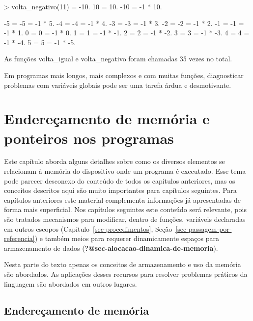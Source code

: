 \documentclass[
  11pt,
  a4paper,
]{scrbook}
\newenvironment{Shaded}{\begin{snugshade}}{\end{snugshade}}
\newcommand{\NormalTok}[1]{#1}
\begin{document}
\begin{Shaded}
\begin{Highlighting}[]
\NormalTok{\textgreater{} volta\_negativo(11) = {-}10.}
\NormalTok{10 = 10.}
\NormalTok{{-}10 = {-}1 * 10.}

\NormalTok{{-}5 = {-}5 = {-}1 * 5.}
\NormalTok{{-}4 = {-}4 = {-}1 * 4.}
\NormalTok{{-}3 = {-}3 = {-}1 * 3.}
\NormalTok{{-}2 = {-}2 = {-}1 * 2.}
\NormalTok{{-}1 = {-}1 = {-}1 * 1.}
\NormalTok{0 = 0 = {-}1 * 0.}
\NormalTok{1 = 1 = {-}1 * {-}1.}
\NormalTok{2 = 2 = {-}1 * {-}2.}
\NormalTok{3 = 3 = {-}1 * {-}3.}
\NormalTok{4 = 4 = {-}1 * {-}4.}
\NormalTok{5 = 5 = {-}1 * {-}5.}

\NormalTok{As funções volta\_igual e volta\_negativo foram chamadas 35 vezes no total.}
\end{Highlighting}
\end{Shaded}

Em programas mais longos, mais complexos e com muitas funções,
diagnosticar problemas com variáveis globais pode ser uma tarefa árdua e
desmotivante.

\chapter{Endereçamento de memória e ponteiros nos
programas}\label{sec-enderecamento-de-memoria-e-ponteiros}

Este capítulo aborda alguns detalhes sobre como os diversos elementos se
relacionam à memória do dispositivo onde um programa é executado. Esse
tema pode parecer desconexo do conteúdo de todos os capítulos
anteriores, mas os conceitos descritos aqui são muito importantes para
capítulos seguintes. Para capítulos anteriores este material complementa
informações já apresentadas de forma mais superficial. Nos capítulos
seguintes este conteúdo será relevante, pois são tratados mecanismos
para modificar, dentro de funções, variáveis declaradas em outros
escopos (Capítulo~\ref{sec-procedimentos},
Seção~\ref{sec-passagem-por-referencia}) e também meios para requerer
dinamicamente espaços para armazenamento de dados
(\textbf{?@sec-alocacao-dinamica-de-memoria}).

Nesta parte do texto apenas os conceitos de armazenamento e uso da
memória são abordados. As aplicações desses recursos para resolver
problemas práticos da linguagem são abordados em outros lugares.

\section{Endereçamento de memória}\label{endereuxe7amento-de-memuxf3ria}
\end{document}
